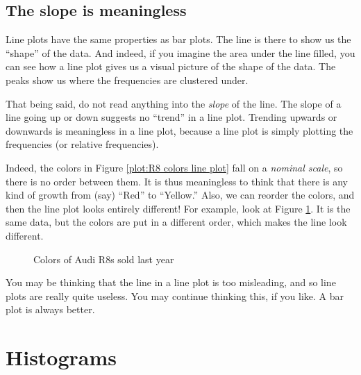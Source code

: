 \documentclass[../../../main.tex]{subfiles}
\begin{document}
\subsection{The slope is meaningless}

Line plots have the same properties as bar plots. The line is there to show us the ``shape'' of the data. And indeed, if you imagine the area under the line filled, you can see how a line plot gives us a visual picture of the shape of the data. The peaks show us where the frequencies are clustered under.

That being said, do not read anything into the \emph{slope} of the line. The slope of a line going up or down suggests no ``trend'' in a line plot. Trending upwards or downwards is meaningless in a line plot, because a line plot is simply plotting the frequencies (or relative frequencies). 

Indeed, the colors in Figure \ref{plot:R8 colors line plot} fall on a \emph{nominal scale}, so there is no order between them. It is thus meaningless to think that there is any kind of growth from (say) ``Red'' to ``Yellow.'' Also, we can reorder the colors, and then the line plot looks entirely different! For example, look at Figure \ref{plot:R8 colors line plot 2}. It is the same data, but the colors are put in a different order, which makes the line look different. 

\begin{figure}[ht]
  \caption{\label{plot:R8 colors line plot 2} Colors of Audi R8s sold last year}
\end{figure}

You may be thinking that the line in a line plot is too misleading, and so line plots are really quite useless. You may continue thinking this, if you like. A bar plot is always better.


\section{Histograms}
\end{document}
